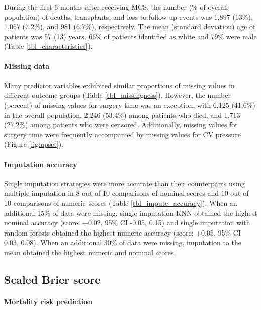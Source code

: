 \documentclass{article}
\begin{document}
During the first 6 months after receiving MCS, the number (\% of overall
population) of deaths, transplants, and loss-to-follow-up events was
1,897 (13\%), 1,067 (7.2\%), and 981 (6.7\%), respectively. The mean
(standard deviation) age of patients was 57 (13) years, 66\% of patients
identified as white and 79\% were male (Table
\ref{tbl_characteristics}).

\paragraph{Missing data}

Many predictor variables exhibited similar proportions of missing values
in different outcome groups (Table \ref{tbl_missingness}). However, the
number (percent) of missing values for surgery time was an exception,
with 6,125 (41.6\%) in the overall population, 2,246 (53.4\%) among
patients who died, and 1,713 (27.2\%) among patients who were censored.
Additionally, missing values for surgery time were frequently
accompanied by missing values for CV pressure (Figure \ref{fig:upset}).

\paragraph{Imputation accuracy}

Single imputation strategies were more accurate than their counterparts
using multiple imputation in 8 out of 10 comparisons of nominal scores
and 10 out of 10 comparisons of numeric scores (Table
\ref{tbl_impute_accuracy}). When an additional 15\% of data were
missing, single imputation KNN obtained the highest nominal accuracy
(score: +0.02, 95\% CI -0.05, 0.15) and single imputation with random
forests obtained the highest numeric accuracy (score: +0.05, 95\% CI
0.03, 0.08). When an additional 30\% of data were missing, imputation to
the mean obtained the highest numeric and nominal scores.

\hypertarget{scaled-brier-score}{%
\subsection{Scaled Brier score}\label{scaled-brier-score}}

\paragraph{Mortality risk prediction}
\end{document}
